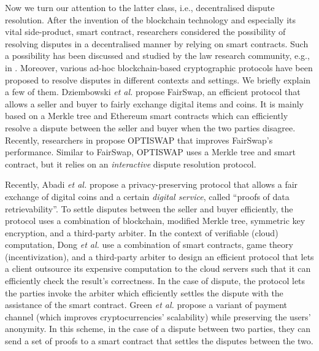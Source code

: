 Now we turn our attention to the latter class, i.e., decentralised dispute resolution. After the invention of the blockchain technology and especially its vital side-product, smart contract, researchers considered the possibility of resolving disputes in a decentralised manner by relying on smart contracts. Such a possibility has been discussed and studied by the law research community, e.g., in \cite{buchwald2019smart,ortolani2016self,ortolani2019impact}. Moreover,  various ad-hoc blockchain-based cryptographic protocols have been proposed to resolve disputes in different contexts and settings. We briefly explain a few of them. Dziembowski \textit{et al.}  \cite{DziembowskiEF18} propose FairSwap, an efficient protocol that allows a seller and buyer to fairly exchange digital items and coins. It is mainly based on a Merkle tree and Ethereum smart contracts which can efficiently resolve a dispute between the seller and buyer when the two parties disagree. Recently, researchers in  \cite{EckeyFS20} propose OPTISWAP that improves FairSwap’s performance. Similar to FairSwap, OPTISWAP uses a Merkle tree and smart contract, but it relies on an \emph{interactive} dispute resolution protocol. 

Recently, Abadi \textit{et al.} \cite{AbadiMZ21a} propose a privacy-preserving protocol that allows a  fair exchange of digital coins and a certain \emph{digital service}, called ``proofs of data retrievability''. To settle disputes between the seller and buyer efficiently, the protocol uses a combination of  blockchain, modified Merkle tree, symmetric key encryption, and a  third-party arbiter. In the context of verifiable (cloud) computation, Dong \textit{et al.} \cite{DongWAMM17} use a combination of smart contracts, game theory (incentivization), and a   third-party arbiter to design an efficient protocol that lets a client outsource its expensive computation to the cloud servers such that it can efficiently check the result's correctness. In the case of dispute, the protocol lets the parties invoke the  arbiter which efficiently settles the dispute with the assistance of the smart contract. Green \textit{et al.} \cite{Bolt} propose a variant  of  payment channel \cite{Lightning-Network} (which improves cryptocurrencies' scalability) while preserving the users' anonymity. In this scheme, in the case of a dispute between two parties, they can send a set of proofs to a smart contract that settles the disputes between the two. 








